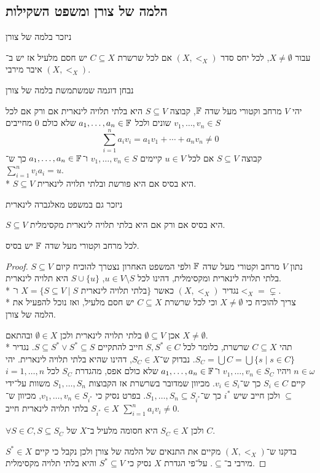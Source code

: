 \subsection{הלמה של צורן ומשפט השקילות}
ניזכר בלמה של צורן
\begin{definition}
	עבור $X \ne \emptyset$, לכל יחס סדר $(X, <_X)$ אם לכל שרשרת $C \subseteq X$ יש חסם מלעיל אז יש ב־$(X, <_X)$ איבר מירבי.
\end{definition}
נבחן דוגמה שמשתמשת בלמה של צורן
\begin{remark}
	יהי $V$ מרחב וקטורי מעל שדה $\mathbb{F}$, קבוצה $S \subseteq V$ היא בלתי תלויה לינארית אם ורק אם לכל $v_1, \dots, v_n \in S$ שונים ולכל $a_1, \dots, a_n \in \mathbb{F}$ שלא כולם 0 מחייבים
	\[
		\sum_{i = 1}^{n} a_i v_i = a_1 v_1 + \cdots + a_n v_n \ne 0
	\]
	קבוצה $S \subseteq V$ אם לכל $u \in V$ קיימים $v_1, \dots, v_n \in S$ ו־$a_1, \dots, a_n \in \mathbb{F}$ כך ש־$\sum_{i = 1}^{n} v_i a_i = u$. \\*
	$S \subseteq V$ היא בסיס אם היא פורשת ובלתי תלויה לינארית.
\end{remark}
ניזכר גם במשפט מאלגברה לינארית
\begin{theorem}
	$S \subseteq V$ היא בסיס אם ורק אם היא בלתי תלויה לינארית מקסימלית.
\end{theorem}
\begin{theorem}
	לכל מרחב וקטורי מעל שדה $\mathbb{F}$ יש בסיס.
\end{theorem}
\begin{proof}
	נתון $V$ מרחב וקטורי מעל שדה $\mathbb{F}$ ולפי המשפט האחרון נצטרך להוכיח קיום $S \subseteq V$ בלתי תלויה לינארית ומקסימלית,
	דהינו לכל $u \in V \setminus S$, $S \cup \{ u \}$ היא תלויה לינארית. \\*
	נגדיר $(X, <_X)$ כאשר $X = \{ S \subseteq V \mid S \text{ בלתי תלויה לינארית}\}$ ו־$<_X = \subsetneq$. \\*
	צריך להוכיח כי $X \ne \emptyset$ וכי לכל שרשרת $C \subseteq X$ יש חסם מלעיל, ואז נוכל להפעיל את הלמה של צורן.

	אכן $\emptyset \subseteq V$ בלתי תלויה לינארית ולכן $\emptyset \in X$ ובהתאם $X \ne \emptyset$. \\*
	תהי $C \subseteq X$ שרשרת, כלומר לכל $S, S^* \in C$ חייב להתקיים $S \subseteq S^* \lor S^* \subseteq S$.
	נגדיר $S_C = \bigcup C = \bigcup \{ s \mid s \in C \}$.
	נבדוק ש־$S_C \in X$, דהינו שהיא בלתי תלויה לינארית.
	יהי $n \in \omega$ ויהיו $v_1, \dots, v_n \in S_C$ ו־$a_1, \dots, a_n \in \mathbb{F}$ שלא כולם אפס, מהגדרת $S_C$ לכל $i = 1, \dots, n$ קיים $S_i \in C$ כך ש־$v_i \in S_i$.
	מכיוון שמדובר בשרשרת אז הקבוצות $S_1, \dots, S_n$ משוות על־ידי $\subseteq$ ולכן חייב שיש $i^*$ כך ש־$S_1, \dots, S_n \subseteq S_{i^*}$.
	בפרט נסיק כי $v_1, \dots, v_n \in S_{i^*}$, מכיוון ש־$S_{i^*} \in X$ בלתי תלויה לינארית חייב $\sum_{i = 1}^{n} a_i v_i \ne 0$.

	$\forall S \in C, S \subseteq S_C$ ולכן $S_C \in X$ היא חסומה מלעיל ב־$X$ של $C$.

	בדקנו ש־$(X, <_X)$ מקיים את התנאים של הלמה של צורן ולכן נקבל כי קיים $S^* \in X$ מירבי ב־$\subseteq$.
	על־פי הגדרת $X$ נסיק כי $S^* \subseteq V$ והיא בלתי תלויה מקסימלית.
\end{proof}
